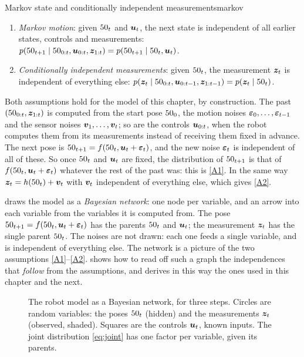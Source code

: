 \begin{definition}{Markov state and conditionally independent measurements}{markov}
\begin{enumerate}[label=(A\arabic*),nosep]
\item\label{A1} \emph{Markov motion}: given $50_{t}$ and $\bm{u}_t$, the
  next state is independent of all earlier states, controls and
  measurements:
  $p(50_{t+1}\mid50_{0:t},\bm{u}_{0:t},\bm{z}_{1:t})=p(50_{t+1}\mid50_t,\bm{u}_t)$.
\item\label{A2} \emph{Conditionally independent measurements}: given
  $50_t$, the measurement $\bm{z}_t$ is independent of everything else:
  $p(\bm{z}_t\mid50_{0:t},\bm{u}_{0:t-1},\bm{z}_{1:t-1})=p(\bm{z}_t\mid50_t)$.
\end{enumerate}
\end{definition}

Both assumptions hold for the model of this chapter, by construction. The
past $(50_{0:t},\bm{z}_{1:t})$ is computed from the start pose $50_0$, the
motion noises $\bm{\varepsilon}_0,\dots,\bm{\varepsilon}_{t-1}$ and the sensor noises
$\bm{v}_1,\dots,\bm{v}_t$; so are the controls $\bm{u}_{0:t}$, when the robot
computes them from its measurements instead of receiving them fixed in
advance. The next pose is $50_{t+1}=f(50_t,\bm{u}_t+\bm{\varepsilon}_t)$,
and the new noise $\bm{\varepsilon}_t$ is independent of all of these. So once
$50_t$ and $\bm{u}_t$ are fixed, the distribution of $50_{t+1}$ is that of
$f(50_t,\bm{u}_t+\bm{\varepsilon}_t)$ whatever the rest of the past was: this is
\ref{A1}. In the same way $\bm{z}_t=h(50_t)+\bm{v}_t$ with $\bm{v}_t$ independent of
everything else, which gives \ref{A2}.

 draws the model as a \emph{Bayesian network}: one node
per variable, and an arrow into each variable from the variables it is
computed from. The pose $50_{t+1}=f(50_t,\bm{u}_t+\bm{\varepsilon}_t)$ has the
parents $50_t$ and $\bm{u}_t$; the measurement $\bm{z}_t$ has the single parent
$50_t$. The noises are not drawn: each one feeds a single variable, and
is independent of everything else. The network is a picture of the two assumptions
\ref{A1}--\ref{A2}.  shows how to read off such a
graph the independences that \emph{follow} from the assumptions, and
derives in this way the ones used in this chapter and the next.

\begin{figure}[ht]
\centering

\caption{The robot model as a Bayesian network, for three steps. Circles
are random variables: the poses $50_t$ (hidden) and the measurements
$\bm{z}_t$ (observed, shaded). Squares are the controls $\bm{u}_t$, known
inputs. The joint distribution \eqref{eq:joint} has one factor per
variable, given its parents.}
\label{fig:bayesnet}
\end{figure}

